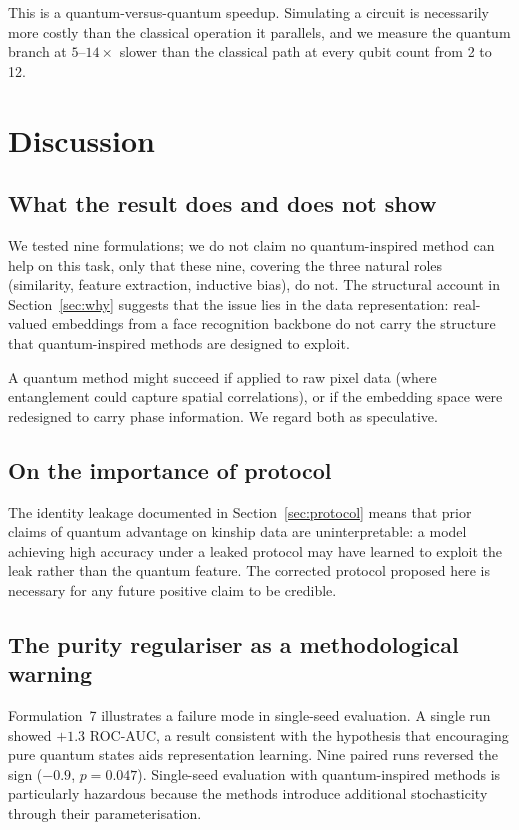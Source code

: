 \documentclass[preprint,12pt]{elsarticle}
\begin{document}
This is a quantum-versus-quantum speedup. Simulating a circuit is necessarily
more costly than the classical operation it parallels, and we measure the
quantum branch at $5$--$14\times$ slower than the classical path at every
qubit count from 2 to 12.

\section{Discussion}
\label{sec:discussion}

\subsection{What the result does and does not show}

We tested nine formulations; we do not claim no quantum-inspired method can
help on this task, only that these nine, covering the three natural roles
(similarity, feature extraction, inductive bias), do not. The structural
account in Section~\ref{sec:why} suggests that the issue lies in the data
representation: real-valued embeddings from a face recognition backbone
do not carry the structure that quantum-inspired methods are designed to
exploit.

A quantum method might succeed if applied to raw pixel data (where
entanglement could capture spatial correlations), or if the embedding space
were redesigned to carry phase information. We regard both as speculative.

\subsection{On the importance of protocol}

The identity leakage documented in Section~\ref{sec:protocol} means that
prior claims of quantum advantage on kinship data are uninterpretable: a
model achieving high accuracy under a leaked protocol may have learned to
exploit the leak rather than the quantum feature. The corrected protocol
proposed here is necessary for any future positive claim to be credible.

\subsection{The purity regulariser as a methodological warning}

Formulation~7 illustrates a failure mode in single-seed evaluation. A single
run showed $+1.3$ ROC-AUC, a result consistent with the hypothesis that
encouraging pure quantum states aids representation learning. Nine paired
runs reversed the sign ($-0.9$, $p = 0.047$). Single-seed evaluation with
quantum-inspired methods is particularly hazardous because the methods
introduce additional stochasticity through their parameterisation.
\end{document}
